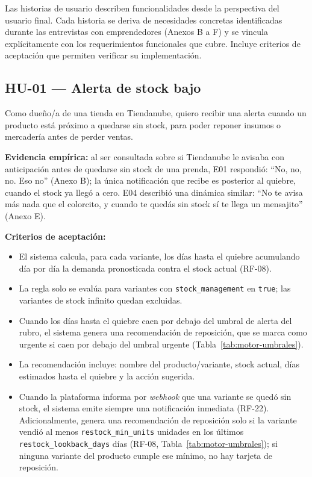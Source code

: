 Las historias de usuario describen funcionalidades desde la perspectiva del usuario final. Cada historia se deriva de necesidades concretas identificadas durante las entrevistas con emprendedores (Anexos B a F) y se vincula explícitamente con los requerimientos funcionales que cubre. Incluye criterios de aceptación que permiten verificar su implementación.

\subsection{HU-01 --- Alerta de stock bajo}
\label{sec:hu-01}

Como dueño/a de una tienda en Tiendanube, quiero recibir una alerta cuando un producto está próximo a quedarse sin stock, para poder reponer insumos o mercadería antes de perder ventas.

\noindent\textbf{Evidencia empírica:} al ser consultada sobre si Tiendanube le avisaba con anticipación antes de quedarse sin stock de una prenda, E01 respondió: \enquote{No, no, no. Eso no} (Anexo B); la única notificación que recibe es posterior al quiebre, cuando el stock ya llegó a cero. E04 describió una dinámica similar: \enquote{No te avisa más nada que el colorcito, y cuando te quedás sin stock sí te llega un mensajito} (Anexo E).

\noindent\textbf{Criterios de aceptación:}
\begin{itemize}
    \item El sistema calcula, para cada variante, los días hasta el quiebre acumulando día por día la demanda pronosticada contra el stock actual (RF-08).
    \item La regla solo se evalúa para variantes con \texttt{stock\_management} en \texttt{true}; las variantes de stock infinito quedan excluidas.
    \item Cuando los días hasta el quiebre caen por debajo del umbral de alerta del rubro, el sistema genera una recomendación de reposición, que se marca como urgente si caen por debajo del umbral urgente (Tabla~\ref{tab:motor-umbrales}).
    \item La recomendación incluye: nombre del producto/variante, stock actual, días estimados hasta el quiebre y la acción sugerida.
    \item Cuando la plataforma informa por \emph{webhook} que una variante se quedó sin stock, el sistema emite siempre una notificación inmediata (RF-22). Adicionalmente, genera una recomendación de reposición solo si la variante vendió al menos \texttt{restock\_min\_units} unidades en los últimos \texttt{restock\_lookback\_days} días (RF-08, Tabla~\ref{tab:motor-umbrales}); si ninguna variante del producto cumple ese mínimo, no hay tarjeta de reposición.
\end{itemize}

